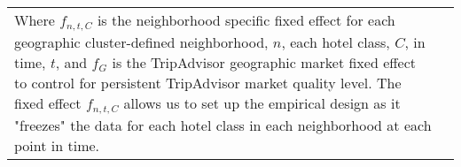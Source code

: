 \begin{table}[!htbp]
{\begin{tabular}{@{\extracolsep{5pt}}lD{.}{.}{-3} D{.}{.}{-3} D{.}{.}{-3} D{.}{.}{-3} D{.}{.}{-3} }
\end{tabular} 
}
\begin{tabular}{p{15cm}c}
Where $f_{n,t,C}$ is the neighborhood specific fixed effect for each geographic cluster-defined neighborhood, $n$, each hotel class, $C$, in time, $t$, and $f_{G}$ is the TripAdvisor geographic market fixed effect to control for persistent TripAdvisor market quality level. The fixed effect $f_{n,t,C}$ allows us to set up the empirical design as it "freezes" the data for each hotel class in each neighborhood at each point in time.

\end{tabular}
\end{table} 
